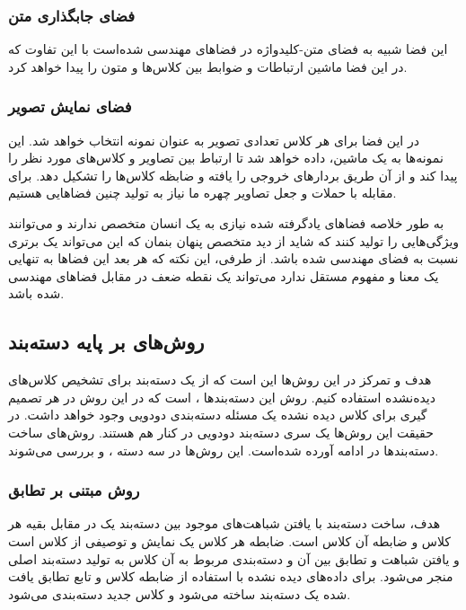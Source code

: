 \subsubsection{‌فضای جابگذاری متن}
این فضا شبیه به فضای متن-کلیدواژه در فضاهای مهندسی شده‌است با این تفاوت که در این فضا ماشین ارتباطات و ضوابط بین کلاس‌ها و متون را پیدا خواهد کرد.

\subsubsection{‌فضای نمایش تصویر}
در این فضا برای هر کلاس تعدادی تصویر به عنوان نمونه انتخاب خواهد شد. این نمونه‌ها به یک ماشین، داده خواهد شد تا ارتباط بین تصاویر و کلاس‌های مورد نظر را پیدا کند و از آن طریق بردارهای خروجی را یافته و ضابظه کلاس‌ها را تشکیل دهد. برای مقابله با حملات و جعل تصاویر چهره ما نیاز به تولید چنین فضاهایی هستیم.

به طور خلاصه فضاهای یادگرفته شده نیازی به یک انسان متخصص ندارند و می‌توانند ویژگی‌هایی را تولید کنند که شاید از دید متخصص پنهان بنمان که این می‌تواند یک برتری نسبت به فضای مهندسی شده باشد. از طرفی، این نکته که هر بعد این فضاها به تنهایی یک معنا و مفهوم مستقل ندارد می‌تواند یک نقطه ضعف در مقابل فضاهای مهندسی شده باشد.

\subsection{روش‌‌های بر پایه دسته‌بند}
هدف و تمرکز در این روش‌ها این است که از یک دسته‌بند برای تشخیص کلاس‌های دیده‌نشده استفاده کنیم. روش این دسته‌بند‌ها
،
است که در این روش در هر تصمیم گیری برای کلاس دیده نشده یک مسئله دسته‌بندی دودویی وجود خواهد داشت. در حقیقت این روش‌ها یک سری دسته‌بند دودویی در کنار هم هستند. روش‌های ساخت دسته‌بند‌ها در ادامه آورده شده‌است. این روش‌ها در سه دسته
،
 و
بررسی می‌شوند.

\subsubsection{‌روش مبتنی بر تطابق}
هدف، ساخت دسته‌بند با یافتن شباهت‌های موجود بین دسته‌بند یک در مقابل بقیه هر کلاس و ضابطه آن کلاس است. ضابطه هر کلاس یک نمایش و توصیفی از کلاس است و یافتن شباهت و تطابق بین آن و دسته‌بندی مربوط به آن کلاس به تولید دسته‌بند اصلی منجر می‌شود. برای داده‌های دیده نشده با استفاده از ضابطه کلاس و تابع تطابق یافت شده یک دسته‌بند ساخته می‌شود و کلاس جدید دسته‌بندی می‌شود.

